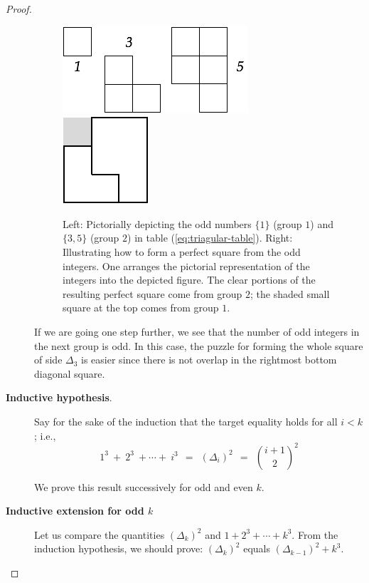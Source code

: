 \begin{proof}
\begin{description}
\begin{figure}[ht]
\begin{center}
       \includegraphics[scale=0.35]{FiguresMaths/SumCubes1} \hspace{2cm}
       \includegraphics[scale=0.4]{FiguresMaths/SumCubes1bis}
\caption{Left: Pictorially depicting the odd numbers  $\{1\}$ (group $1$) and $\{3, 5\}$  (group $2$)
in table (\ref{eq:triagular-table}).
Right: Illustrating how to form a perfect square from the odd integers. 
One arranges the pictorial representation of the integers into the
depicted figure. The clear portions of the resulting perfect square come from 
group $2$; the shaded small square at the top comes from 
group $1$.}
       \label{fig:sumCubes1}
\end{center}
\end{figure}

If we are going one step further, we see that the number of odd integers in the next group is odd.
In this case, the puzzle for forming the whole square of side $\Delta_3$
is easier since there is not overlap in the rightmost bottom diagonal square.
\medskip

\item[{\bf Inductive hypothesis}.]
Say for the sake of the induction that the target equality holds for all $i < k$; i.e.,
\[ 1^3 \ + \ 2^3 \ + \cdots + \ i^3 \ \ = \ \ (\Delta_i)^2 \ \ = \ \ {{i+1} \choose 2}^2 \]

We prove this result successively for odd and even $k$.


\item[{\bf Inductive extension for odd $k$}]

Let us compare the quantities  $(\Delta_k)^2$ and $1 + 2^3 + \cdots + k^3$.
From the induction hypothesis, we should prove: $(\Delta_k)^2$ equals $(\Delta_{k-1})^2 + k^3$. 


\end{description}
\end{proof}
